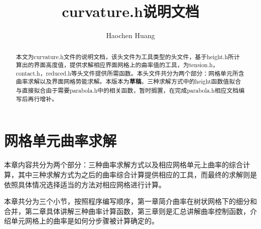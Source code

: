 \documentclass[lang=cn,11pt,a4paper]{elegantpaper}
\title{curvature.h说明文档}
\author{Haochen Huang}
\institute{西安交通大学MFM课题组}
\date{\zhtoday}
\begin{document}
\maketitle
\begin{abstract}
  本文为curvature.h文件的说明文档，该头文件为工具类型的头文件，基于height.h所计算出的界面高度值，提供求解相应界面网格上的曲率值的工具，为tension.h，contact.h，reduced.h等头文件提供所需函数。本头文件共分为两个部分：网格单元所含曲率求解以及界面网格势能求解。本版本为\textbf{草稿}，三种求解方式中的height函数值拟合与直接拟合由于需要parabola.h中的相关函数，暂时搁置，在完成parabola.h相应文档编写后再行增补。
\end{abstract}

\tableofcontents

\section{网格单元曲率求解}
本章内容共分为两个部分：三种曲率求解方式以及相应网格单元上曲率的综合计算，其中三种求解方式为之后的曲率综合计算提供相应的工具，而最终的求解则是依照具体情况选择适当的方法对相应网格进行计算。\par
本章共分为三个小节，按照程序编写顺序，第一章简介曲率在树状网格下的细分和合并，第二章具体讲解三种曲率计算函数，第三章则是汇总讲解曲率控制函数，介绍单元网格上的曲率是如何分步骤被计算确定的。
\end{document}
